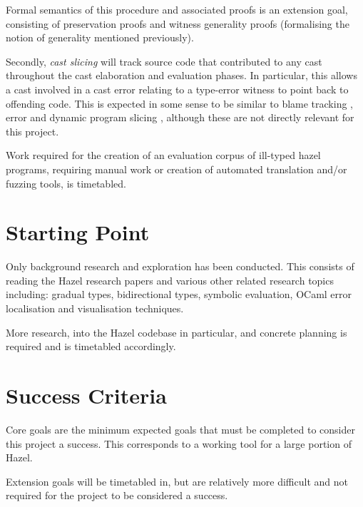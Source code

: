 Formal semantics of this procedure and associated proofs is an extension goal, consisting of preservation proofs and witness generality proofs (formalising the notion of generality mentioned previously).\par

Secondly, \textit{cast slicing} will track source code that contributed to any cast throughout the cast elaboration and evaluation phases.  In particular, this allows a cast involved in a cast error relating to a type-error witness to point back to offending code. This is expected in some sense to be similar to blame tracking \cite{Blame}, error and dynamic program slicing \cite{ErrSlice, DynProgSlice}, although these are not directly relevant for this project.\par 

Work required for the creation of an evaluation corpus of ill-typed hazel programs, requiring manual work or creation of automated translation and/or fuzzing tools, is timetabled.

\section{Starting Point}
Only background research and exploration has been conducted. This consists of reading the Hazel research papers \cite{Hazel} and various other related research topics including: gradual types, bidirectional types, symbolic evaluation, OCaml error localisation and visualisation techniques.\par 
More research, into the Hazel codebase in particular, and concrete planning is required and is timetabled accordingly.

\section{Success Criteria}
Core goals are the minimum expected goals that must be completed to consider this project a success. This corresponds to a working tool for a large portion of Hazel.\par 
Extension goals will be timetabled in, but are relatively more difficult and not required for the project to be considered a success.\par 


